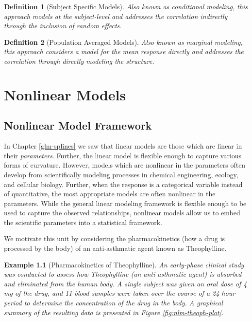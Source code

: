 \documentclass[
]{book}
\theoremstyle{plain}
\theoremstyle{mydefn}
\newtheorem{definition}{Definition}[chapter]
\theoremstyle{myexmpl}
\newtheorem{example}{Example}[chapter]
\theoremstyle{remark}
\begin{document}
\begin{definition}[Subject Specific Models]
\protect\hypertarget{def:defn-subject-specific}{}{\label{def:defn-subject-specific} {} }Also known as conditional modeling, this approach models at the subject-level and addresses the correlation indirectly through the inclusion of random effects.
\end{definition}

\begin{definition}[Population Averaged Models]
\protect\hypertarget{def:defn-population-average}{}{\label{def:defn-population-average} {} }Also known as marginal modeling, this approach considers a model for the mean response directly and addresses the correlation through directly modeling the structure.
\end{definition}

\hypertarget{part-nonlinear-models}{%
\part{Nonlinear Models}\label{part-nonlinear-models}}

\hypertarget{nlm-framework}{%
\chapter{Nonlinear Model Framework}\label{nlm-framework}}

In Chapter \ref{glm-splines} we saw that linear models are those which are linear in their \emph{parameters}. Further, the linear model is flexible enough to capture various forms of curvature. However, models which are nonlinear in the parameters often develop from scientifically modeling processes in chemical engineering, ecology, and cellular biology. Further, when the response is a categorical variable instead of quantitative, the most appropriate models are often nonlinear in the parameters. While the general linear modeling framework is flexible enough to be used to capture the observed relationships, nonlinear models allow us to embed the scientific parameters into a statistical framework.

We motivate this unit by considering the pharmacokinetics (how a drug is processed by the body) of an anti-asthmatic agent known as Theophylline.

\begin{example}[Pharmacokinetics of Theophylline]
\protect\hypertarget{exm:nlm-theoph}{}{\label{exm:nlm-theoph} {} }An early-phase clinical study was conducted to assess how Theophylline (an anti-asthmatic agent) is absorbed and eliminated from the human body. A single subject was given an oral dose of 4 mg of the drug, and 11 blood samples were taken over the course of a 24 hour period to determine the concentration of the drug in the body. A graphical summary of the resulting data is presented in Figure \ref{fig:nlm-theoph-plot}.
\end{example}
\end{document}
